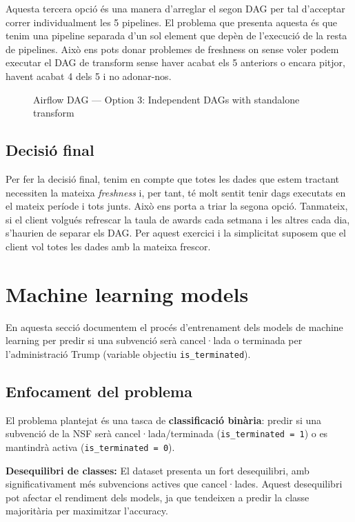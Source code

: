 \documentclass[12pt, a4paper]{article}
\begin{document}
Aquesta tercera opció és una manera d'arreglar el segon DAG per tal d'acceptar correr individualment les 5 pipelines. El problema que presenta aquesta és que tenim una pipeline separada d'un sol element que depèn de l'execució de la resta de pipelines. Això  ens pots donar problemes de freshness on sense voler podem executar el DAG de transform sense haver acabat els 5 anteriors o encara pitjor, havent acabat 4 dels 5 i no adonar-nos.
\begin{figure}[H]
    \centering
    
    \caption{Airflow DAG — Option 3: Independent DAGs with standalone transform}
    \label{fig:dag3}
\end{figure}
\subsection{Decisió final}
Per fer la decisió final, tenim en compte que totes les dades que estem tractant necessiten la mateixa \textit{freshness} i, per tant, té molt sentit tenir dags executats en el mateix període i tots junts. Això ens porta a triar la segona opció. Tanmateix, si el client volgués refrescar la taula de awards cada setmana i les altres cada dia, s'haurien de separar els DAG. Per aquest exercici i la simplicitat suposem que el client vol totes les dades amb la mateixa frescor.


\section{Machine learning models}

En aquesta secció documentem el procés d'entrenament dels models de machine learning per predir si una subvenció serà cancel·lada o terminada per l'administració Trump (variable objectiu \texttt{is\_terminated}).

\subsection{Enfocament del problema}

El problema plantejat és una tasca de \textbf{classificació binària}: predir si una subvenció de la NSF serà cancel·lada/terminada (\texttt{is\_terminated = 1}) o es mantindrà activa (\texttt{is\_terminated = 0}).

\textbf{Desequilibri de classes:} El dataset presenta un fort desequilibri, amb significativament més subvencions actives que cancel·lades. Aquest desequilibri pot afectar el rendiment dels models, ja que tendeixen a predir la classe majoritària per maximitzar l'accuracy.
\end{document}
